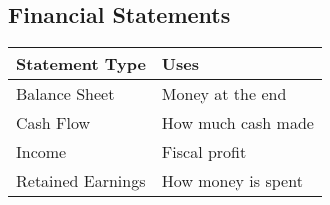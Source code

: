 \documentclass[landscape, letterpaper, 10pt]{article}
\begin{document}
\begin{multicols}{3}
    \section*{Financial Statements}
    \begin{tabular}{|l|l|}
        \hline
        Statement Type    & Uses               \\ \hline
        Balance Sheet     & Money at the end   \\ \hline
        Cash Flow         & How much cash made \\ \hline
        Income            & Fiscal profit      \\ \hline
        Retained Earnings & How money is spent \\ \hline
    \end{tabular}


\end{multicols}
\end{document}
